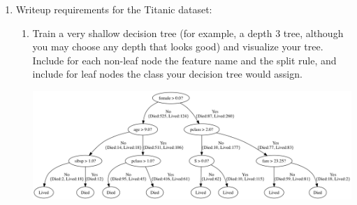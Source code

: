 \documentclass{article}
\begin{document}
\begin{enumerate}
\newpage
    \item Writeup requirements for the Titanic dataset:
    \begin{enumerate}
    \item Train a very shallow decision tree (for example, a depth 3 tree,
      although you may choose any depth that looks good) and visualize your
      tree. Include for each non-leaf node the feature name and the split rule,
      and include for leaf nodes the class your decision tree would assign.
        \begin{mdframed}
          \includegraphics[width=400pt]{img/titanic.png}
        \end{mdframed}
    \end{enumerate}
\end{enumerate}
\end{document}

